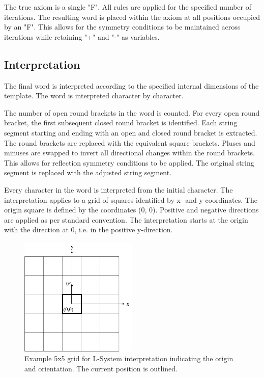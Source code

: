 The true axiom is a single "F". All rules are applied for the specified number of iterations. The resulting word is placed within the axiom at all positions occupied by an "F". This allows for the symmetry conditions to be maintained across iterations while retaining "+" and "-" as variables.

\subsection{Interpretation}

The final word is interpreted according to the specified internal dimensions of the template. The word is interpreted character by character.

The number of open round brackets in the word is counted. For every open round bracket, the first subsequent closed round bracket is identified. Each string segment starting and ending with an open and closed round bracket is extracted. The round brackets are replaced with the equivalent square brackets. Pluses and minuses are swapped to invert all directional changes within the round brackets. This allows for reflection symmetry conditions to be applied. The original string segment is replaced with the adjusted string segment.

Every character in the word is interpreted from the initial character. The interpretation applies to a grid of squares identified by x- and y-coordinates. The origin square is defined by the coordinates (0, 0). Positive and negative directions are applied as per standard convention. The interpretation starts at the origin with the direction at 0\textdegree, i.e. in the positive y-direction.

\begin{figure}[H]
	\centering
	\includegraphics[width=0.5\textwidth]{LSOrigin.png}
	\caption{Example 5x5 grid for L-System interpretation indicating the origin and orientation. The current position is outlined.}
	\label{fig:lso}
\end{figure}

